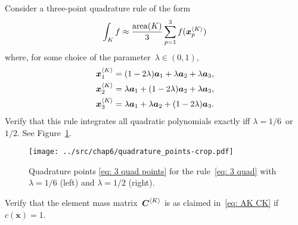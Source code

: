 \begin{Exercises}
\exercise
Consider a three-point quadrature rule of the form
\begin{equation}\label{eq: 3 quad}
\int_Kf\approx\frac{\mathrm{area}(K)}{3}\sum_{p=1}^3 
    f(\boldsymbol{x}^{\langle K\rangle}_p)
\end{equation}
where, for some choice of the parameter~$\lambda\in(0,1)$, 
\begin{equation}\label{eq: 3 quad points}
\begin{aligned}
\boldsymbol{x}^{\langle K\rangle}_1=(1-2\lambda)\boldsymbol{a}_1+\lambda\boldsymbol{a}_2
    +\lambda\boldsymbol{a}_3,\\
\boldsymbol{x}^{\langle K\rangle}_2=\lambda\boldsymbol{a}_1+(1-2\lambda)\boldsymbol{a}_2
    +\lambda\boldsymbol{a}_3,\\
\boldsymbol{x}^{\langle K\rangle}_3=\lambda\boldsymbol{a}_1+\lambda\boldsymbol{a}_2
    +(1-2\lambda)\boldsymbol{a}_3.
\end{aligned}
\end{equation}
Verify that this rule integrates all quadratic polynomials exactly iff
$\lambda=1/6$~or $1/2$.  See Figure~\ref{fig: quadrature points}.
\begin{figure}
\caption{Quadrature points \eqref{eq: 3 quad points} for the 
rule~\eqref{eq: 3 quad} with $\lambda=1/6$ (left) and $\lambda=1/2$ (right).}
\label{fig: quadrature points}
\begin{center}
\texttt{[image: ../src/chap6/quadrature\_points-crop.pdf]}
\end{center}
\end{figure}

\exercise
Verify that the element mass matrix~$\boldsymbol{C}^{\langle K\rangle}$ is as claimed
in~\eqref{eq: AK CK} if $c(\boldsymbol{x})=1$.


\end{Exercises}
